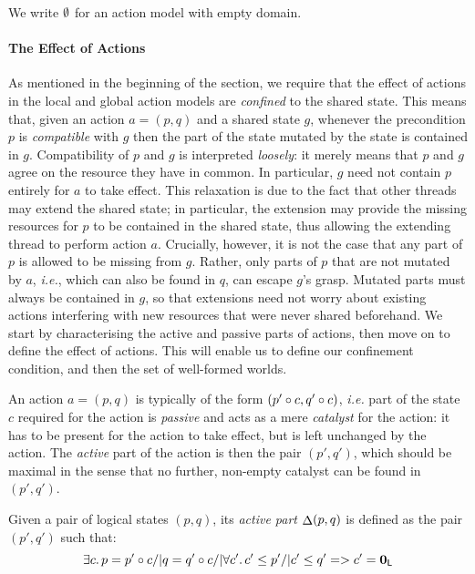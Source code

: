 We write $\emptyset$ for an action model with empty domain.


\paragraph{The Effect of Actions} As mentioned in the beginning of the
section, we require that the effect of actions in the local and global
action models are \emph{confined} to the shared state. This means
that, given an action $a = (p,q)$ and a shared state $g$, whenever the
precondition $p$ is \emph{compatible} with $g$ then the part of the
state mutated by the state is contained in $g$. Compatibility of $p$
and $g$ is interpreted \emph{loosely}: it merely means that $p$ and
$g$ agree on the resource they have in common. In particular, $g$ need
not contain $p$ entirely for $a$ to take effect. This relaxation is
due to the fact that other threads may extend the shared state; in
particular, the extension may provide the missing resources for $p$ to
be contained in the shared state, thus allowing the extending thread
to perform action $a$. Crucially, however, it is not the case that any
part of $p$ is allowed to be missing from $g$. Rather, only parts of
$p$ that are not mutated by $a$, \textit{i.e.}, which can also be
found in $q$, can escape $g$'s grasp. Mutated parts must always be
contained in $g$, so that extensions need not worry about existing
actions interfering with new resources that were never shared
beforehand. We start by characterising the active and passive parts of
actions, then move on to define the effect of actions. This will
enable us to define our confinement condition, and then the set of
well-formed worlds.

An action $a = (p, q)$ is typically of the form $(p'\circ c,
q'\circ c)$, \textit{i.e.} part of the state $c$ required for
the action is \emph{passive} and acts as a mere \emph{catalyst} for
the action: it has to be present for the action to take effect, but is
left unchanged by the action. The \emph{active} part of the action is then
the pair $(p',q')$, which should be maximal in the sense that no
further, non-empty catalyst can be found in $(p',q')$.

\begin{definition}
  Given a pair of logical states $(p, q)$, its \emph{active part}
  $\mathop{\Delta} (p,q)$ is defined as the pair $(p', q')$ such that:
  \vspace{-1ex}
  \[
  \vspace{-1ex}
  \E c p = p' \composeL c /| q = q' \composeL c /| \V{c'} c'\leq p' /|
  c'\leq q' => c' = \unitL
  \]
\end{definition}

